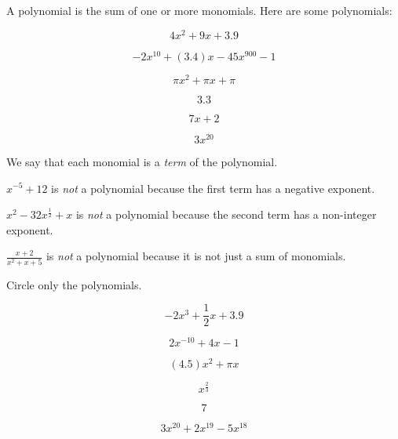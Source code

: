 A polynomial  is the sum of one or more monomials.  Here are some polynomials:
\begin{multicols}{3}
  \begin{equation*}
    4 x^2 + 9x + 3.9
  \end{equation*}

  \begin{equation*}
    -2 x^{10} + (3.4)x - 45x^{900} - 1
  \end{equation*}

  \begin{equation*}
    \pi x^2 + \pi x + \pi
  \end{equation*}

  \begin{equation*}
    3.3
  \end{equation*}

  \begin{equation*}
   7x + 2
  \end{equation*}

  \begin{equation*}
    3x^{20}
  \end{equation*}
\end{multicols}
We say that each monomial is a \emph{term} of the polynomial.

$x^{-5} + 12$ is \emph{not} a polynomial because the first term has a negative exponent.

$x^{2} - 32x^{\frac{1}{2}} + x$ is \emph{not} a polynomial because the second term has a non-integer exponent.

$\frac{x + 2}{x^2 + x + 5}$ is \emph{not} a polynomial because it is not just a sum of monomials.

\begin{Exercise}[title={Identifying Polynomials}, label=findpolynomials]
    Circle only the polynomials.
\begin{multicols}{3}
  \begin{equation*}
    -2 x^3 + \frac{1}{2}x + 3.9
  \end{equation*}

  \begin{equation*}
    2 x^{-10} + 4x - 1
  \end{equation*}
  
  \begin{equation*}
    (4.5)x^2 + \pi x
  \end{equation*}
  
  \begin{equation*}
    x^{\frac{2}{3}}
  \end{equation*}
  
  \begin{equation*}
   7
  \end{equation*}

  \begin{equation*}
    3x^{20} + 2x^{19} -5 x^{18}
  \end{equation*}
\end{multicols}
\end{Exercise}

